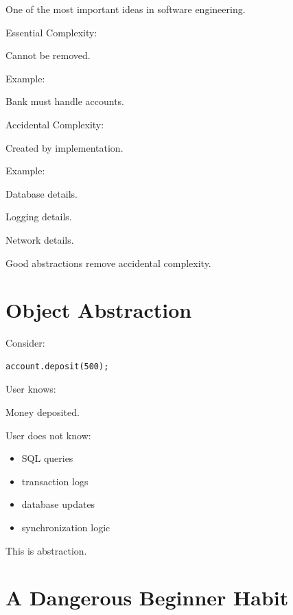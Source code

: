 \documentclass[11pt,a4paper]{book}
\begin{document}
One of the most important ideas in software engineering.


Essential Complexity:

Cannot be removed.

Example:

Bank must handle accounts.


Accidental Complexity:

Created by implementation.

Example:

Database details.

Logging details.

Network details.


Good abstractions remove accidental complexity.


\section{Object Abstraction}

Consider:

\begin{verbatim}
account.deposit(500);
\end{verbatim}

User knows:

Money deposited.


User does not know:

\begin{itemize}
\item SQL queries
\item transaction logs
\item database updates
\item synchronization logic
\end{itemize}


This is abstraction.


\section{A Dangerous Beginner Habit}
\end{document}
